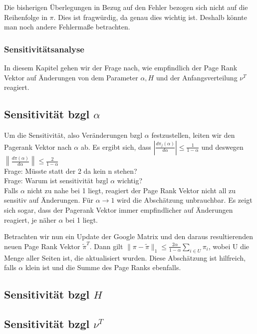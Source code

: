 \documentclass[]{article}
\begin{document}
Die bisherigen Überlegungen in Bezug auf den Fehler bezogen sich nicht auf die Reihenfolge in $\pi$. Dies ist fragwürdig, da genau dies wichtig ist. Deshalb könnte man noch andere Fehlermaße betrachten.

\subsubsection{Sensitivitätsanalyse}

In diesem Kapitel gehen wir der Frage nach, wie empfindlich der Page Rank Vektor auf Änderungen von dem Parameter $\alpha, H $ und der Anfangsverteilung $\nu^T$ reagiert. 

\subsection*{Sensitivität bzgl $\alpha$}
Um die Sensitivität, also Veränderungen bzgl $\alpha$ festzustellen, leiten wir den Pagerank Vektor nach $\alpha$ ab. Es ergibt sich, dass $\left| \frac{d \pi_j(\alpha)}{d \alpha}\right| \le \frac{1}{1 - \alpha} $ und deswegen $\left\| \frac{d \pi(\alpha)}{d \alpha} \right\| \le \frac{2}{1 - \alpha} $ \\

Frage: Müsste statt der 2 da kein n stehen? \\

Frage: Warum ist sensitivität bzgl $\alpha $ wichtig? \\

Falls $\alpha$ nicht zu nahe bei 1 liegt, reagiert der Page Rank Vektor nicht all zu sensitiv auf Änderungen. Für $\alpha \rightarrow 1$ wird die Abschätzung unbrauchbar. Es zeigt sich sogar, dass der Pagerank Vektor immer empfindlicher auf Änderungen reagiert, je näher $\alpha$ bei 1 liegt. 

Betrachten wir nun ein Update der Google Matrix und den daraus resultierenden neuen Page Rank Vektor $\tilde{\pi}^T$. Dann gilt $\| \pi - \tilde{\pi}\|_1 \le \frac{2 \alpha}{1 - \alpha } \sum\limits_{i \in U} \pi_i$, wobei U die Menge aller Seiten ist, die aktualisiert wurden. Diese Abschätzung ist hilfreich, falls $\alpha$ klein ist und die Summe des Page Ranks ebenfalls.  

\subsection*{Sensitivität bzgl $H$}




\subsection*{Sensitivität bzgl $\nu^T$}
\end{document}
